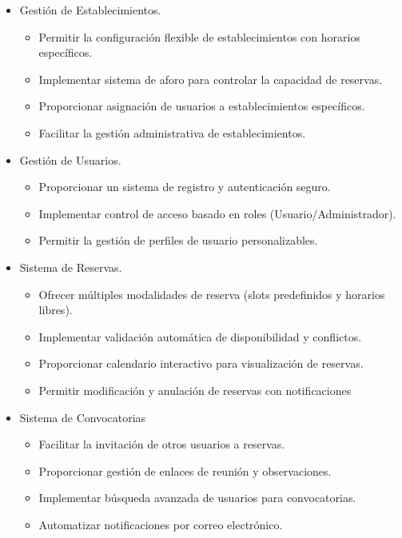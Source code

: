 \begin{itemize}
\tightlist
\item
Gestión de Establecimientos.
    \begin{itemize}
    \tightlist
    \item
    Permitir la configuración flexible de establecimientos con horarios específicos.
    \item
    Implementar sistema de aforo para controlar la capacidad de reservas.
    \item
    Proporcionar asignación de usuarios a establecimientos específicos.
    \item
    Facilitar la gestión administrativa de establecimientos.
    \end{itemize}

\item
Gestión de Usuarios.
    \begin{itemize}
    \tightlist
    \item
    Proporcionar un sistema de registro y autenticación seguro.
    \item
    Implementar control de acceso basado en roles (Usuario/Administrador).
    \item
    Permitir la gestión de perfiles de usuario personalizables.
    \end{itemize}

\item
Sistema de Reservas.
    \begin{itemize}
    \tightlist
    \item
    Ofrecer múltiples modalidades de reserva (slots predefinidos y horarios libres).
    \item
    Implementar validación automática de disponibilidad y conflictos.
    \item
    Proporcionar calendario interactivo para visualización de reservas.
    \item
    Permitir modificación y anulación de reservas con notificaciones
    \end{itemize}

\item
Sistema de Convocatorias
    \begin{itemize}
    \tightlist
    \item
    Facilitar la invitación de otros usuarios a reservas.
    \item
    Proporcionar gestión de enlaces de reunión y observaciones.
    \item
    Implementar búsqueda avanzada de usuarios para convocatorias.
    \item
    Automatizar notificaciones por correo electrónico.
    \end{itemize}


\end{itemize}
